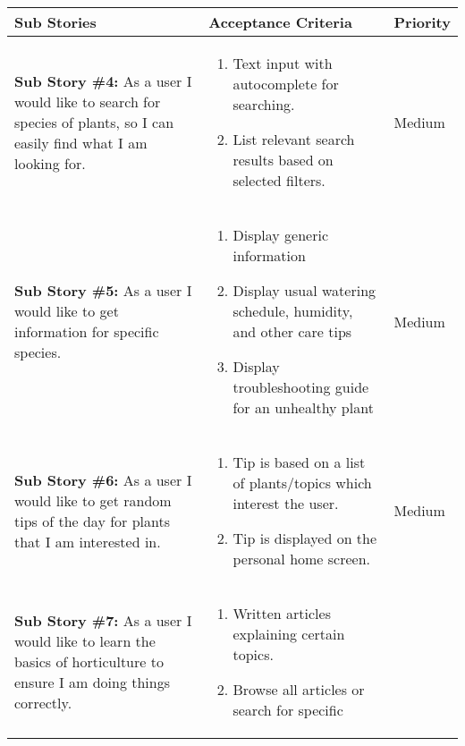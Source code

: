 \documentclass[portfolio.tex.tex]{subfiles}
\begin{document}
					\begin{tabular}{p{6cm}|p{6cm}|p{4cm}}
						\large\textbf{Sub Stories} & \large \textbf{Acceptance Criteria} &\large \textbf{ Priority} \\
						\hline


						\textbf{Sub Story \#4:} As a user I would like to search for species of plants, so I can easily find what I am looking for.  &
						\vspace{-0.8cm}
						\begin{enumerate}
							\item  	Text input with autocomplete for searching.
							\item 	List relevant search results based on selected filters.
						\end{enumerate}&

						\vspace{-1cm}\color{orange}Medium\\

						\textbf{Sub Story \#5:} As a user I would like to get information for specific species. &
						\vspace{-0.8cm}
						\begin{enumerate}
							\item  	Display generic information
							\item 	Display usual watering schedule, humidity, and other care tips
							\item 	Display troubleshooting guide for an unhealthy plant
						\end{enumerate}&

						\vspace{-1cm}\color{orange}Medium\\

						\textbf{Sub Story \#6:} As a user I would like to get random tips of the day for plants that I am interested in.  &
						\vspace{-0.8cm}
						\begin{enumerate}
							\item 	Tip is based on a list of plants/topics which interest the user.
							\item 	Tip is displayed on the personal home screen.
						\end{enumerate}&

						\vspace{-1cm}\color{orange}Medium\\

						\textbf{Sub Story \#7:} As a user I would like to learn the basics of horticulture to ensure I am doing things correctly.  &
						\vspace{-0.8cm}
						\begin{enumerate}
							\item 	Written articles explaining certain topics.
							\item 	Browse all articles or search for specific
						\end{enumerate}&


\end{tabular}
\end{document}
